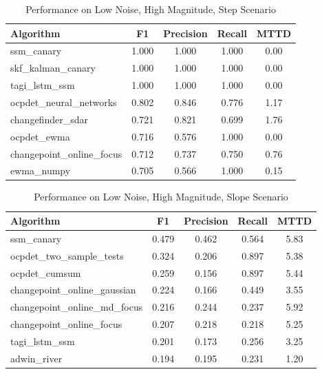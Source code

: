 \documentclass[journal,article,submit,pdftex,moreauthors]{Definitions/mdpi}
\begin{document}
\begin{table}[H]
\centering
\caption{Performance on Low Noise, High Magnitude, Step Scenario}
\label{tab:scenario_bajo_alto_escalon}
\small
\begin{tabular}{lcccc}
\toprule
\textbf{Algorithm} & \textbf{F1} & \textbf{Precision} & \textbf{Recall} & \textbf{MTTD} \\
\midrule
ssm\_canary & 1.000 & 1.000 & 1.000 & 0.00 \\
skf\_kalman\_canary & 1.000 & 1.000 & 1.000 & 0.00 \\
tagi\_lstm\_ssm & 1.000 & 1.000 & 1.000 & 0.00 \\
ocpdet\_neural\_networks & 0.802 & 0.846 & 0.776 & 1.17 \\
changefinder\_sdar & 0.721 & 0.821 & 0.699 & 1.76 \\
ocpdet\_ewma & 0.716 & 0.576 & 1.000 & 0.00 \\
changepoint\_online\_focus & 0.712 & 0.737 & 0.750 & 0.76 \\
ewma\_numpy & 0.705 & 0.566 & 1.000 & 0.15 \\
\bottomrule
\end{tabular}
\end{table}

\begin{table}[H]
\centering
\caption{Performance on Low Noise, High Magnitude, Slope Scenario}
\label{tab:scenario_bajo_alto_pendiente}
\small
\begin{tabular}{lcccc}
\toprule
\textbf{Algorithm} & \textbf{F1} & \textbf{Precision} & \textbf{Recall} & \textbf{MTTD} \\
\midrule
ssm\_canary & 0.479 & 0.462 & 0.564 & 5.83 \\
ocpdet\_two\_sample\_tests & 0.324 & 0.206 & 0.897 & 5.38 \\
ocpdet\_cumsum & 0.259 & 0.156 & 0.897 & 5.44 \\
changepoint\_online\_gaussian & 0.224 & 0.166 & 0.449 & 3.55 \\
changepoint\_online\_md\_focus & 0.216 & 0.244 & 0.237 & 5.92 \\
changepoint\_online\_focus & 0.207 & 0.218 & 0.218 & 5.25 \\
tagi\_lstm\_ssm & 0.201 & 0.173 & 0.256 & 3.25 \\
adwin\_river & 0.194 & 0.195 & 0.231 & 1.20 \\
\bottomrule
\end{tabular}
\end{table}
\end{document}
